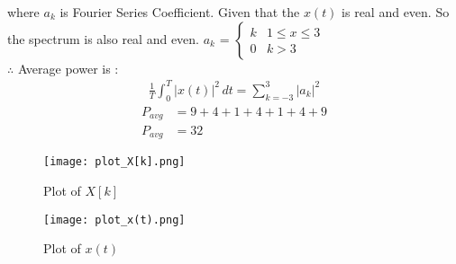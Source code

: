 \documentclass[journal,12pt,twocolumn]{IEEEtran}
\begin{document}
where $a_k$ is Fourier Series Coefficient.
Given that the $x(t)$ is real and even. So the spectrum is also real and even.
$a_k$ = $\begin{cases} 
            k & 1\leq x\leq 3\\
            0 & k>3
        \end{cases}$\\  
$\therefore$ Average power is :
\begin{align}
    \frac{1}{T}\int_{0}^{T}\lvert x(t)\rvert^2\,dt = \sum_{k=-3}^{3}\lvert a_k\rvert^2
\end{align}
\begin{align}
    P_{avg} &= 9+4+1+4+1+4+9\\
    P_{avg} &= 32
\end{align}
\begin{figure}[!h]
         \centering
         \texttt{[image: plot\_X[k].png]}
         \caption{Plot of $X[k]$}
         \label{plot}
\end{figure}
\begin{figure}[!h]
         \centering
         \texttt{[image: plot\_x(t).png]}
         \caption{Plot of $x(t)$}
         \label{plot}
\end{figure}
\end{document}

